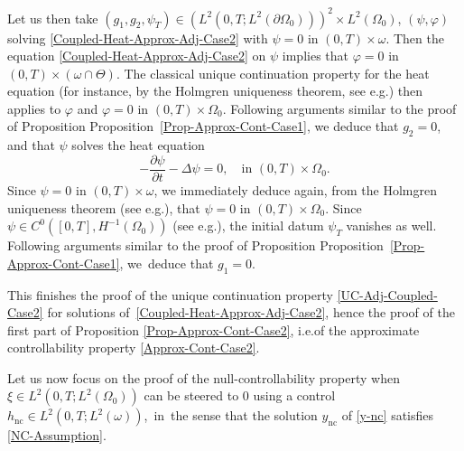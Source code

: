 \documentclass[10pt,a4paper]{amsart}
\providecommand{\ie}{i.e.}
\providecommand{\eg}{e.g.}
\newcommand{\nc}{\mathrm{nc}}
\theoremstyle{definition}
\begin{document}
Let us then take $(g_1, g_2, \psi_T) \in (L^2(0,T; L^2(\partial\Omega_0)))^2\times L^2(\Omega_0)$, $(\psi, \varphi)$ solving \eqref{Coupled-Heat-Approx-Adj-Case2} with $\psi = 0$ in $(0,T) \times \omega$. Then the equation \eqref{Coupled-Heat-Approx-Adj-Case2} on $\psi$ implies that $\varphi = 0$ in $(0,T)\times {(\omega\cap \Theta)}$. The classical unique continuation property for the heat equation (for instance, by the Holmgren uniqueness theorem, see \eg \cite[\S8.6 \& Th.\,8.6.5]{Hormander-2003}) then applies to $\varphi$ and $\varphi = 0$ in $(0,T)\times \Omega_0$. Following arguments similar to the proof of Proposition Proposition~\ref{Prop-Approx-Cont-Case1}, we deduce that $g_2 = 0$, and that $\psi$ solves the heat equation
\[
-\dfrac{\partial \psi}{\partial t}-\Delta \psi =0, \quad \text{in }(0,T) \times \Omega_0.
\]
Since $\psi = 0$ in $(0,T) \times \omega$, we immediately deduce again, from the Holmgren uniqueness theorem (see \eg \cite[\S8.6 \& Th.\,8.6.5]{Hormander-2003}), that $\psi = 0$ in $(0,T) \times \Omega_0$. Since $\psi\in C^0([0,T],H^{-1}(\Omega_0))$ (see \eg \cite[Prop.\,7.1.3]{TWBook}), the initial datum $\psi_T$ vanishes as well. Following arguments similar to the proof of Proposition Proposition~\ref{Prop-Approx-Cont-Case1}, we~deduce that $g_1 = 0$.

This finishes the proof of the unique continuation property \eqref{UC-Adj-Coupled-Case2} for solutions of~\eqref{Coupled-Heat-Approx-Adj-Case2}, hence the proof of the first part of Proposition \ref{Prop-Approx-Cont-Case2}, \ie of the approximate controllability property \eqref{Approx-Cont-Case2}.

Let us now focus on the proof of the null-controllability property when~$\xi\in L^2(0,T; L^2(\Omega_0))$ can be steered to $0$ using a control $h_{\nc} \!\in\! L^2(0,T; L^2(\omega))$,~in~the sense that the solution $y_{\nc}$ of \eqref{y-nc} satisfies \eqref{NC-Assumption}.
\end{document}
